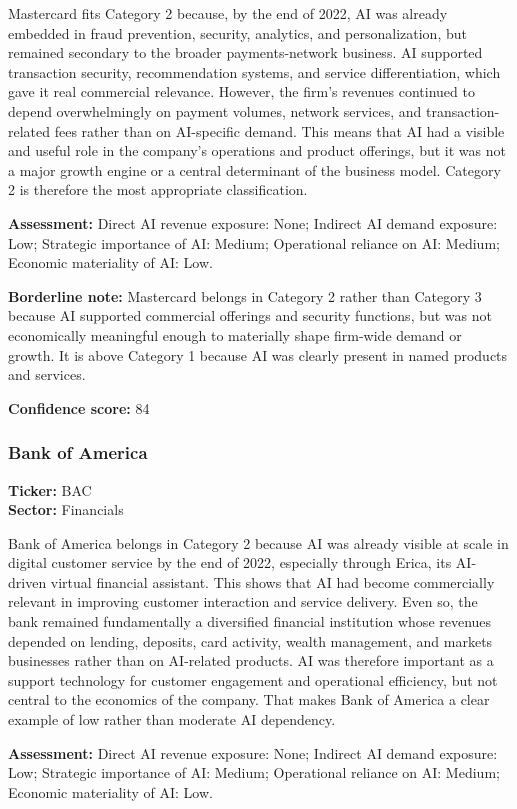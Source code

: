 \documentclass{article}
\begin{document}
Mastercard fits Category 2 because, by the end of 2022, AI was already embedded in fraud prevention, security, analytics, and personalization, but remained secondary to the broader payments-network business. AI supported transaction security, recommendation systems, and service differentiation, which gave it real commercial relevance. However, the firm’s revenues continued to depend overwhelmingly on payment volumes, network services, and transaction-related fees rather than on AI-specific demand. This means that AI had a visible and useful role in the company’s operations and product offerings, but it was not a major growth engine or a central determinant of the business model. Category 2 is therefore the most appropriate classification.

\textbf{Assessment:} Direct AI revenue exposure: None; Indirect AI demand exposure: Low; Strategic importance of AI: Medium; Operational reliance on AI: Medium; Economic materiality of AI: Low.

\textbf{Borderline note:} Mastercard belongs in Category 2 rather than Category 3 because AI supported commercial offerings and security functions, but was not economically meaningful enough to materially shape firm-wide demand or growth. It is above Category 1 because AI was clearly present in named products and services.

\textbf{Confidence score:} 84

\subsubsection*{Bank of America}
\textbf{Ticker:} BAC \\
\textbf{Sector:} Financials

Bank of America belongs in Category 2 because AI was already visible at scale in digital customer service by the end of 2022, especially through Erica, its AI-driven virtual financial assistant. This shows that AI had become commercially relevant in improving customer interaction and service delivery. Even so, the bank remained fundamentally a diversified financial institution whose revenues depended on lending, deposits, card activity, wealth management, and markets businesses rather than on AI-related products. AI was therefore important as a support technology for customer engagement and operational efficiency, but not central to the economics of the company. That makes Bank of America a clear example of low rather than moderate AI dependency.

\textbf{Assessment:} Direct AI revenue exposure: None; Indirect AI demand exposure: Low; Strategic importance of AI: Medium; Operational reliance on AI: Medium; Economic materiality of AI: Low.
\end{document}
